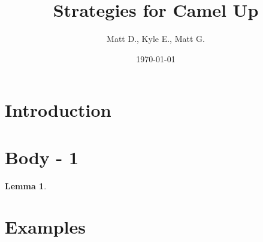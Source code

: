 \documentclass{article}
\title{Strategies for Camel Up}
\author{Matt D., Kyle E., Matt G.}
\date{\today}
\newtheorem{lemma}{Lemma}[section]
\begin{document}
\maketitle
\section{Introduction}

\section{Body - 1}

\begin{lemma}
	
\end{lemma}

\section{Examples}
\end{document}
